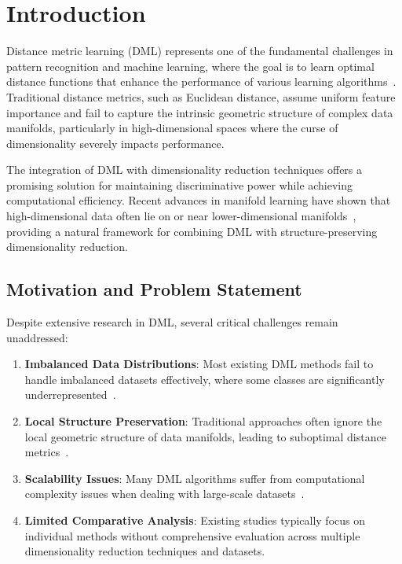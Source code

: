 \documentclass[review]{elsarticle}
\begin{document}
\linenumbers

\section{Introduction}
\label{sec:introduction}

Distance metric learning (DML) represents one of the fundamental challenges in pattern recognition and machine learning, where the goal is to learn optimal distance functions that enhance the performance of various learning algorithms~\cite{bellet2013survey}. Traditional distance metrics, such as Euclidean distance, assume uniform feature importance and fail to capture the intrinsic geometric structure of complex data manifolds, particularly in high-dimensional spaces where the curse of dimensionality severely impacts performance.

The integration of DML with dimensionality reduction techniques offers a promising solution for maintaining discriminative power while achieving computational efficiency. Recent advances in manifold learning have shown that high-dimensional data often lie on or near lower-dimensional manifolds~\cite{roweis2000nonlinear,tenenbaum2000global}, providing a natural framework for combining DML with structure-preserving dimensionality reduction.

\subsection{Motivation and Problem Statement}

Despite extensive research in DML, several critical challenges remain unaddressed:

\begin{enumerate}
\item \textbf{Imbalanced Data Distributions}: Most existing DML methods fail to handle imbalanced datasets effectively, where some classes are significantly underrepresented~\cite{domeniconi2002locally}.

\item \textbf{Local Structure Preservation}: Traditional approaches often ignore the local geometric structure of data manifolds, leading to suboptimal distance metrics~\cite{yang2006efficient}.

\item \textbf{Scalability Issues}: Many DML algorithms suffer from computational complexity issues when dealing with large-scale datasets~\cite{weinberger2008fast}.

\item \textbf{Limited Comparative Analysis}: Existing studies typically focus on individual methods without comprehensive evaluation across multiple dimensionality reduction techniques and datasets.
\end{enumerate}
\end{document}
